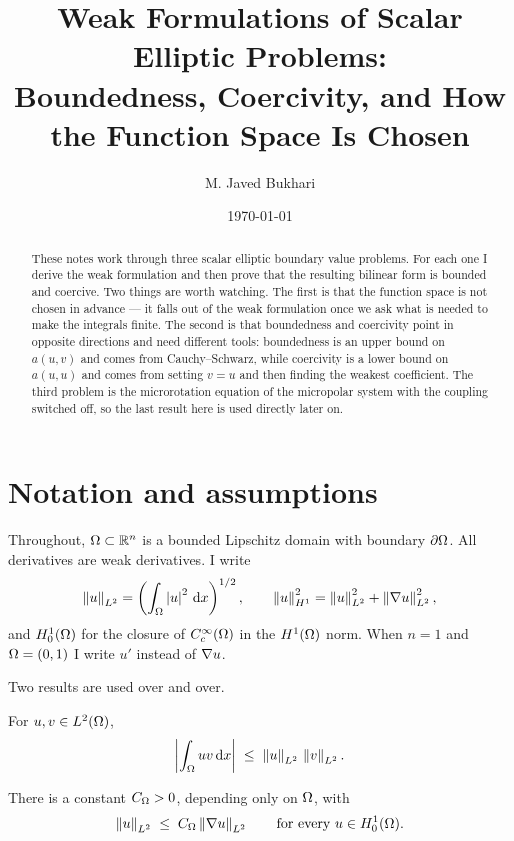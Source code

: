 \documentclass[11pt,a4paper]{article}
\title{Weak Formulations of Scalar Elliptic Problems:\\
Boundedness, Coercivity, and How the Function Space Is Chosen}
\author{M. Javed Bukhari}
\date{\today}
\begin{document}
\maketitle

\begin{abstract}
These notes work through three scalar elliptic boundary value problems. For each
one I derive the weak formulation and then prove that the resulting bilinear form
is bounded and coercive. Two things are worth watching. The first is that the
function space is not chosen in advance --- it falls out of the weak formulation
once we ask what is needed to make the integrals finite. The second is that
boundedness and coercivity point in opposite directions and need different tools:
boundedness is an upper bound on $a(u,v)$ and comes from Cauchy--Schwarz, while
coercivity is a lower bound on $a(u,u)$ and comes from setting $v=u$ and then
finding the weakest coefficient. The third problem is the microrotation equation
of the micropolar system with the coupling switched off, so the last result here
is used directly later on.
\end{abstract}

\tableofcontents

\section{Notation and assumptions}

Throughout, $\Omega \subset \mathbb{R}^{n}$ is a bounded Lipschitz domain with boundary
$\partial\Omega$. All derivatives are weak derivatives. I write
\[
  \left\lVert u \right\rVert_{L^{2}} = \left( \int_\Omega \left\lvert u \right\rvert^{2} \,\mathrm{d}x \right)^{1/2},
  \qquad
  \left\lVert u \right\rVert_{H^{1}}^{2} = \left\lVert u \right\rVert_{L^{2}}^{2} + \left\lVert \nabla u \right\rVert_{L^{2}}^{2},
\]
and $H^{1}_{0}(\Omega)$ for the closure of $C_{c}^{\infty}(\Omega)$ in the $H^{1}(\Omega)$ norm. When $n=1$ and
$\Omega=(0,1)$ I write $u'$ instead of $\nabla u$.

Two results are used over and over.

\begin{lemma}\label{lem:cs}
For $u,v \in L^{2}(\Omega)$,
\[
  \left\lvert \int_\Omega uv \,\mathrm{d}x \right\rvert \;\le\; \left\lVert u \right\rVert_{L^{2}}\,\left\lVert v \right\rVert_{L^{2}}.
\]
\end{lemma}

\begin{lemma}\label{lem:poincare}
There is a constant $C_\Omega > 0$, depending only on $\Omega$, with
\[
  \left\lVert u \right\rVert_{L^{2}} \;\le\; C_\Omega \left\lVert \nabla u \right\rVert_{L^{2}}
  \qquad \text{for every } u \in H^{1}_{0}(\Omega) .
\]
\end{lemma}
\end{document}
